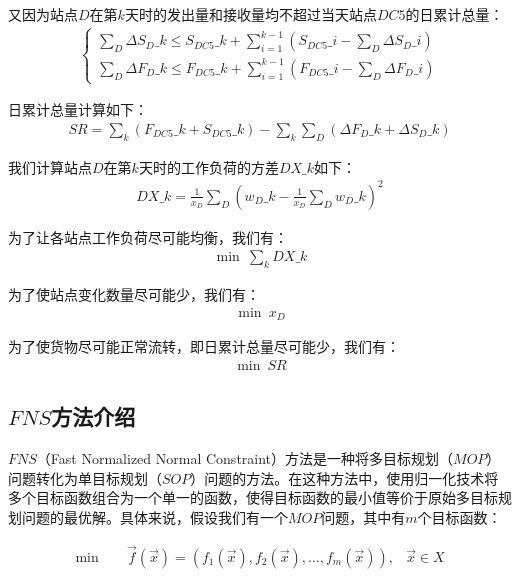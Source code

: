 \documentclass{MathorCupmodeling}
\begin{document}
又因为站点$D$在第$k$天时的发出量和接收量均不超过当天站点$DC5$的日累计总量：
\begin{eqnarray}
\left\{\begin{matrix}
 \sum\limits_D\Delta S_D\_k\le S_{DC5}\_k+\sum\limits_{i=1}^{k-1}(S_{DC5}\_i-\sum\limits_D\Delta S_{D}\_i) \\
  \sum\limits_D\Delta F_D\_k\le F_{DC5}\_k+\sum\limits_{i=1}^{k-1}(F_{DC5}\_i-\sum\limits_D\Delta F_{D}\_i)
\end{matrix}\right.
\end{eqnarray}

日累计总量计算如下：
\begin{eqnarray}
SR=\sum\limits_{k}(F_{DC5}\_k+S_{DC5}\_k)-\sum\limits_k\sum\limits_D(\Delta F_{D}\_k+\Delta S_{D}\_k)
\end{eqnarray}

我们计算站点$D$在第$k$天时的工作负荷的方差$DX\_k$如下：
\begin{eqnarray}
DX\_k=\frac{1}{x_D}\sum\limits_D(w_D\_k-\frac{1}{x_D}\sum\limits_Dw_D\_k)^2
\end{eqnarray}

为了让各站点工作负荷尽可能均衡，我们有：
\begin{eqnarray}
\min \  \sum\limits_kDX\_k
\end{eqnarray}

为了使站点变化数量尽可能少，我们有：
\begin{eqnarray}
\min \ x_D
\end{eqnarray}

为了使货物尽可能正常流转，即日累计总量尽可能少，我们有：
\begin{eqnarray}
\min \ SR
\end{eqnarray}
\subsection{$FNS$方法介绍}
$FNS$（Fast Normalized Normal Constraint）方法是一种将多目标规划（$MOP$）问题转化为单目标规划（$SOP$）问题的方法。在这种方法中，使用归一化技术将多个目标函数组合为一个单一的函数，使得目标函数的最小值等价于原始多目标规划问题的最优解。具体来说，假设我们有一个$MOP$问题，其中有$m$个目标函数：

\begin{equation}
\begin{aligned}
\min \ \quad &\vec{f}(\vec{x})=(f_1(\vec{x}),f_2(\vec{x}),\dots,f_m(\vec{x})),&\vec{x}\in X
\end{aligned}
\end{equation}
\end{document}
